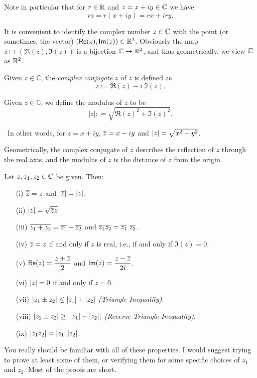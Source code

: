 Note in particular that for $r \in \mathbb{R}$ and $z = x+iy \in \mathbb{C}$ we have
\[
rz = r(x+iy) = rx+iry.
\]





It is convenient to identify the complex number $z \in \mathbb{C}$ with the point (or sometimes, the vector) $(\textsf{Re} (z), \textsf{Im} (z) ) \in \mathbb{R}^2$.  Obviously the map $z \mapsto ( \Re (z), \Im (z))$ is a bijection $\mathbb{C} \to \mathbb{R}^2$, and thus geometrically, we view $\mathbb{C}$ as $\mathbb{R}^2$.




\begin{definition}
Given $ z \in \mathbb{C}$, the \emph{complex conjugate} $\overline{z}$ of $z$ is defined as
\[
\overline{z} := \Re (z) - i\ \Im (z). 
\]
\end{definition}

\begin{definition}[Modulus]
Given $z \in \mathbb{C}$, we define the modulus of $z$ to be
\[
| z | : = \sqrt{ \Re (z)^2 + \Im (z)^2 }.
\]
\end{definition}
\
In other words, for $z=x+iy$, $\overline{z}=x-iy$ and $\left| z \right| = \sqrt{x^2+y^2}$.


Geometrically, the complex conjugate of $z$ describes the reflection of $z$ through the real axis, and the modulus of $z$ is the distance of $z$ from the origin.


\begin{proposition}
\label{p:absmod}
Let $z,z_1,z_2 \in \mathbb{C}$ be given.
Then:
\begin{enumerate}
\item[(i)] $\overline{\overline{z}} = z$ and $\left| \overline{z} \right| = \left| z \right|$.
\item[(ii)] $\left| z \right| = \sqrt{\overline{z}z}$
\item[(iii)] $\overline{z_1+z_2} = \overline{z_1} + \overline{z_2}$ and $\conj{z_1z_2} = \conj{z_1}\ \conj{z_2}$.
\item[(iv)] $\overline{z} = z$ if and only if $z$ is real, i.e., if and only if $\Im (z)=0$.
\item[(v)] $\textsf{Re} (z) = \displaystyle\frac{z + \overline{z}}{2}$ and $\textsf{Im} (z) = \displaystyle\frac{z - \overline{z}}{2i}$.
\item[(vi)] $\left| z \right| = 0$ if and only if $z = 0$.
\item[(vii)] $\left| z_1 \pm z_2 \right| \leq \left| z_1 \right| + \left| z_2 \right|$ \emph{(Triangle Inequality)}.
\item[(viii)] $\left| z_1 \pm z_2 \right| \geq \left| \left| z_1 \right| - \left| z_2 \right| \right|$ \emph{(Reverse Triangle Inequality)}.
\item[(ix)] $\left| z_1z_2 \right| = \left| z_1 \right| \left| z_2 \right|$.
\end{enumerate}
\end{proposition}
You really should be familiar with all of these properties.  I would suggest trying to prove at least some of them, or verifying them for some specific choices of $z_1$ and $z_2$. Most of the proofs are short.

